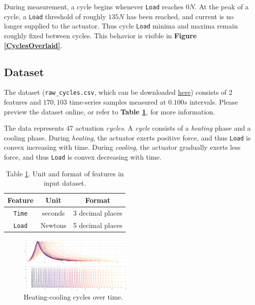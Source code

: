 \documentclass[letterpaper, 10 pt, conference]{ieeeconf}  %
\begin{document}
During measurement, a cycle begins whenever \verb|Load| reaches $0N$. At the peak of a cycle, a \verb|Load| threshold of roughly $135N$ has been reached, and current is no longer supplied to the actuator. Thus cycle \verb|Load| minima and maxima remain roughly fixed between cycles. This behavior is visible in \textbf{Figure \ref{CyclesOverlaid}}.

\subsection{Dataset}

The dataset (\verb|raw_cycles.csv|, which can be downloaded \href{https://github.com/Columbia-Creative-Machines-Lab/muscle-prediction}{here}) consists of $2$ features and $170,103$ time-series samples measured at $0.100s$ intervals. Please preview the dataset online, or refer to \textbf{Table \ref{Dataset}}, for more information.

The data represents $47$ actuation \textit{cycles}. A \textit{cycle} consists of a \textit{heating} phase and a cooling phase. During \textit{heating}, the actuator exerts positive force, and thus \verb|Load| is convex increasing with time. During \textit{cooling}, the actuator gradually exerts less force, and thus \verb|Load| is convex decreasing with time. 

\begin{table}[h] %
  \centering
  \begin{tabular}{ c | c c }
      Feature & Unit & Format \\
      \hline
      \verb|Time| & seconds & 3 decimal places \\
      \verb|Load| & Newtons & 5 decimal places
  \end{tabular}
  \label{Dataset}
  \caption*{Table \ref{Dataset}. Unit and format of features in input dataset.}
\end{table}

\label{CyclesOverlaid}
\begin{figure}[h]
	\centering
	\includegraphics[width=0.5\textwidth]{assets/cyclesoverlaid.png}
    \caption{Heating-cooling cycles over time.}
\end{figure}
\end{document}

